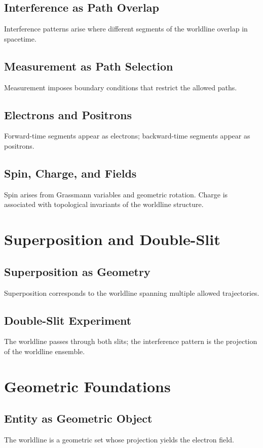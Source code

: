 \documentclass[12pt]{article}
\begin{document}
\subsection{Interference as Path Overlap}
Interference patterns arise where different segments of the worldline overlap in spacetime.

\subsection{Measurement as Path Selection}
Measurement imposes boundary conditions that restrict the allowed paths.

\subsection{Electrons and Positrons}
Forward-time segments appear as electrons; backward-time segments appear as positrons.

\subsection{Spin, Charge, and Fields}
Spin arises from Grassmann variables and geometric rotation. Charge is associated with topological invariants
of the worldline structure.

\section{Superposition and Double-Slit}

\subsection{Superposition as Geometry}
Superposition corresponds to the worldline spanning multiple allowed trajectories.

\subsection{Double-Slit Experiment}
The worldline passes through both slits; the interference pattern is the projection of the worldline ensemble.

\section{Geometric Foundations}

\subsection{Entity as Geometric Object}
The worldline is a geometric set whose projection yields the electron field.
\end{document}
